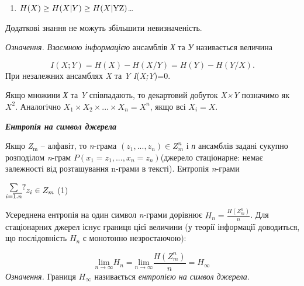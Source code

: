 \documentclass[a4paper]{article}
\newcommand\textsubscript[1]{\ensuremath{{}_{\text{#1}}}}
\newcounter{saveenum}
\newcommand\liststyleWWviiiNumxxxix{%
\renewcommand\theenumi{\arabic{enumi}}
\renewcommand\theenumii{\arabic{enumii}}
\renewcommand\theenumiii{\arabic{enumiii}}
\renewcommand\theenumiv{\arabic{enumiv}}
\renewcommand\labelenumi{\theenumi)}
\renewcommand\labelenumii{\theenumii.}
\renewcommand\labelenumiii{\theenumiii.}
\renewcommand\labelenumiv{\theenumiv.}
}
\newcounter{}
\newcommand\normalsubformula[1]{\text{\mathversion{normal}$#1$}}
\begin{document}
\liststyleWWviiiNumxxxix
\setcounter{saveenum}{\value{enumi}}
\begin{enumerate}
\setcounter{enumi}{\value{saveenum}}
\item  ${H(X)\ge H(X|Y)\ge H(X|\normalsubformula{\text{YZ}})}$…
\end{enumerate}
Додаткові знання не можуть збільшити невизначеність.


\bigskip

\textit{Означення.}\textit{  Взаємною інформацією} ансамблів \textit{Х} та
\textit{У }називається величина 

\begin{equation*}
{I(X;Y)=H(X)-H(X/Y)=H(Y)-H(Y/X)\text{.}}
\end{equation*}
При незалежних ансамблях \textit{X} та \textit{Y} 
\textit{I}(\textit{X}\textit{;}\textit{Y})=0.


\bigskip

Якщо множини \textit{Х} та \textit{Y} співпадають, то декартовий добуток
\textit{X×Y} позначимо як  ${X^{{2}}}$. Аналогічно  ${X_{{1}}\times
X_{{2}}\times \text{.}\text{.}\text{.}\times X_{{n}}=X^{{n}}}$, якщо всі 
${X_{{i}}=X}$.


\bigskip


\bigskip

{\centering\bfseries\itshape
Ентропія на символ джерела
\par}


\bigskip


\bigskip

Якщо \textit{Z}\textit{\textsubscript{m}} – алфавіт, то \textit{n}{}-грама 
${(z_{{1}},\text{.}\text{.}\text{.},z_{{n}})\in Z_{{m}}^{{n}}}$ і \textit{п}
ансамблів задані сукупно розподілом \textit{n}{}-грам 
${P(x_{{1}}=z_{{1}},\text{.}\text{.}\text{.},x_{{n}}=z_{{n}})}$(джерело
стаціонарне: немає залежності від розташування n-грами в тексті). Ентропія
\textit{n}{}-грами

{\centering
  $\begin{matrix}\underset{i=\overline{{1\text{.}n}}}{\sum }?\hfill\null
\end{matrix}{z_{{i}}\in Z_{{m}}}\hfill $  (1)
\par}

Усереднена ентропія на один символ \textit{n}{}-грами дорівнює 
${H_{{n}}=\frac{H(Z_{{m}}^{{n}})}{n}}$. Для стаціонарних джерел існує границя
цієї величини (у теорії інформації доводиться, що послідовність  ${H_{{n}}}$ є
монотонно незростаючою):

\begin{equation*}
{\underset{{n\rightarrow \infty }}{{\text{lim}}}H_{{n}}=\underset{{n\rightarrow
\infty }}{{\text{lim}}}\frac{H(Z_{{m}}^{{n}})}{n}=H_{{\infty }}}
\end{equation*}
\textit{Означення.} Границя  ${H_{{\infty }}}$ називається \textit{ентропією на
символ джерела}. 
\end{document}
